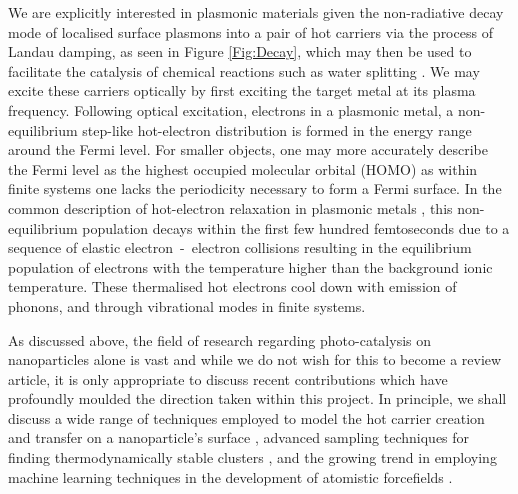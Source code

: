 We are explicitly interested in plasmonic materials given the non-radiative decay mode of localised surface plasmons into a pair of hot carriers via the process of Landau damping, as seen in Figure \ref{Fig:Decay}, which may then be used to facilitate the catalysis of chemical reactions such as water splitting \cite{LSPCatalysis}. We may excite these carriers optically by first exciting the target metal at its plasma frequency. Following  optical excitation, electrons in a plasmonic metal, a non-equilibrium step-like hot-electron distribution is formed in the energy range around the Fermi level. For smaller objects, one may more accurately describe the Fermi level as the highest occupied molecular orbital (HOMO) as within finite systems one lacks the periodicity necessary to form a Fermi surface. In the common description of hot-electron relaxation in plasmonic metals \cite{PhysRevB.50.15337,PhysRevB.100.045412,Sjakste_2018,doi:10.1021/acsphotonics.7b00751,Memarzadeh:20,osti_1594820}, this non-equilibrium population decays within the first few hundred femtoseconds due to a sequence of elastic electron~-~electron collisions resulting in the equilibrium population of electrons with the temperature higher than the background ionic temperature. These thermalised hot electrons cool down with emission of phonons, and through vibrational modes in finite systems. 

As discussed above, the field of research regarding photo-catalysis on nanoparticles alone is vast and while we do not wish for this to become a review article, it is only appropriate to discuss recent contributions which have profoundly moulded the direction taken within this project. In principle, we shall discuss a wide range of techniques employed to model the hot carrier creation and transfer on a nanoparticle's surface \cite{NordLander,HotCarrierTransport}, advanced sampling techniques for finding thermodynamically stable clusters \cite{Structure_Thermo_EnergyLandscape,FerrandoEquilibrium}, and the growing trend in employing machine learning techniques in the development of atomistic forcefields \cite{MLInterface,hansen2019atomisticMLFF}.

